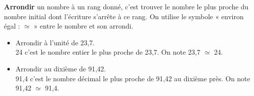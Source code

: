 \begin{Définition}[c]
\textbf{Arrondir} un nombre à un rang donné, c'est trouver le nombre le plus proche du nombre initial dont l'écriture s'arrête à ce rang. On utilise le symbole « environ égal : $\simeq$ » entre le nombre et son arrondi.
\end{Définition}

\begin{Exemples}
\begin{itemize}
\item Arrondir à l'unité de 23,7.\\
24 c'est le nombre entier le plus proche de 23,7. On note 23,7 $\simeq$ 24.

\item Arrondir au dixième de 91,42.\\
91,4 c'est le nombre décimal le plus proche de 91,42 au dixième près. On note 91,42 $\simeq$ 91,4.

\end{itemize}
\end{Exemples}
